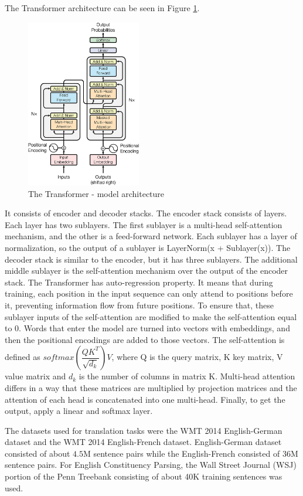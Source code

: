 \documentclass[times, utf8, seminar]{fer}
\begin{document}
The Transformer architecture can be seen in Figure \ref{fig:transformer_architecture}.
\begin{figure}[htb]
\centering
\includegraphics[width=5cm]{img/transformer_architecture.png}
\caption{The Transformer - model architecture}
\label{fig:transformer_architecture}
\end{figure}
It consists of encoder and decoder stacks. The encoder stack consists of layers. Each layer has two sublayers. The first sublayer is a multi-head self-attention mechanism, and the other is a feed-forward network. Each sublayer has a layer of normalization, so the output of a sublayer is LayerNorm(x + Sublayer(x)). The decoder stack is similar to the encoder, but it has three sublayers. The additional middle sublayer is the self-attention mechanism over the output of the encoder stack. The Transformer has auto-regression property.  It means that during training, each position in the input sequence can only attend to positions before it, preventing information flow from future positions. To ensure that, these sublayer inputs of the self-attention are modified to make the self-attention equal to 0. Words that enter the model are turned into vectors with embeddings, and then the positional encodings are added to those vectors. The self-attention is defined as $softmax \left(\dfrac{QK^T}{\sqrt{d_k}}\right)V$, where Q is the query matrix, K key matrix, V value matrix and $d_k$ is the number of columns in matrix K. Multi-head attention differs in a way that these matrices are multiplied by projection matrices and the attention of each head is concatenated into one multi-head. Finally, to get the output, apply a linear and softmax layer.


The datasets used for translation tasks were the WMT 2014 English-German dataset and the WMT 2014 English-French dataset. English-German dataset consisted of about $4.5$M sentence pairs while the English-French consisted of $36$M sentence pairs. For English Constituency Parsing, the Wall Street Journal (WSJ) portion of the
Penn Treebank \citep{marcus1993building} consisting of about 40K training sentences was used.
\end{document}
